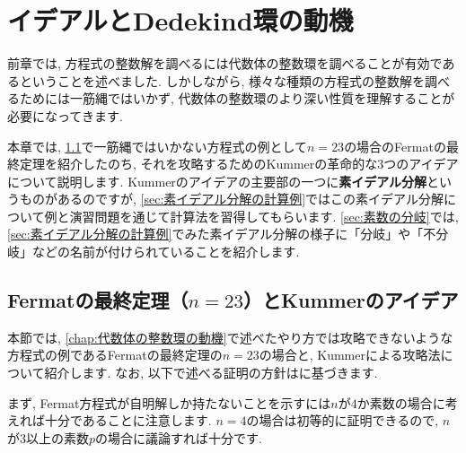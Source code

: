 \documentclass[11pt,b5paper,oneside,titlepage,lualatex]{ltjsreport}
\numberwithin{equation}{section} %
\begin{document}
\clearpage


\chapter{イデアルとDedekind環の動機} \label{chap:イデアルとDedekind環の動機}


前章では, 方程式の整数解を調べるには代数体の整数環を調べることが有効であるということを述べました. 
しかしながら, 様々な種類の方程式の整数解を調べるためには一筋縄ではいかず, 代数体の整数環のより深い性質を理解することが必要になってきます. 

本章では, \cref{sec:Fermatの最終定理（n=23）}で一筋縄ではいかない方程式の例として$ n=23 $の場合のFermatの最終定理を紹介したのち, それを攻略するためのKummerの革命的な3つのアイデアについて説明します. 
Kummerのアイデアの主要部の一つに\textbf{素イデアル分解}というものがあるのですが, \cref{sec:素イデアル分解の計算例}ではこの素イデアル分解について例と演習問題を通じて計算法を習得してもらいます. 
\cref{sec:素数の分岐}では, \cref{sec:素イデアル分解の計算例}でみた素イデアル分解の様子に「分岐」や「不分岐」などの名前が付けられていることを紹介します. 


\section{Fermatの最終定理（$ n=23 $）とKummerのアイデア} \label{sec:Fermatの最終定理（n=23）}


本節では, \cref{chap:代数体の整数環の動機}で述べたやり方では攻略できないような方程式の例であるFermatの最終定理の$ n=23 $の場合と, Kummerによる攻略法について紹介します. 
なお, 以下で述べる証明の方針は\cite[定理 8.11.15]{Yukie1}に基づきます. 

まず, Fermat方程式が自明解しか持たないことを示すには$ n $が$ 4 $か素数の場合に考えれば十分であることに注意します. 
$ n=4 $の場合は初等的に証明できるので, $ n $が$ 3 $以上の素数$ p $の場合に議論すれば十分です. 
\end{document}
